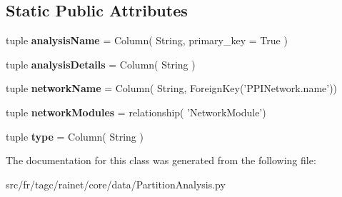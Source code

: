 \subsection*{Static Public Attributes}
\begin{DoxyCompactItemize}
\item 
\hypertarget{classsrc_1_1fr_1_1tagc_1_1rainet_1_1core_1_1data_1_1PartitionAnalysis_1_1PartitionAnalysis_a8151a5d4080cf71ca7425bfd0a0b0d81}{tuple {\bfseries analysis\-Name} = Column( String, primary\-\_\-key = True )}\label{classsrc_1_1fr_1_1tagc_1_1rainet_1_1core_1_1data_1_1PartitionAnalysis_1_1PartitionAnalysis_a8151a5d4080cf71ca7425bfd0a0b0d81}

\item 
\hypertarget{classsrc_1_1fr_1_1tagc_1_1rainet_1_1core_1_1data_1_1PartitionAnalysis_1_1PartitionAnalysis_aff8d031a12b0652881869d9e77bbc648}{tuple {\bfseries analysis\-Details} = Column( String )}\label{classsrc_1_1fr_1_1tagc_1_1rainet_1_1core_1_1data_1_1PartitionAnalysis_1_1PartitionAnalysis_aff8d031a12b0652881869d9e77bbc648}

\item 
\hypertarget{classsrc_1_1fr_1_1tagc_1_1rainet_1_1core_1_1data_1_1PartitionAnalysis_1_1PartitionAnalysis_aa0ad9c28fd195f301aa9e1d993ec00f5}{tuple {\bfseries network\-Name} = Column( String, Foreign\-Key('P\-P\-I\-Network.\-name'))}\label{classsrc_1_1fr_1_1tagc_1_1rainet_1_1core_1_1data_1_1PartitionAnalysis_1_1PartitionAnalysis_aa0ad9c28fd195f301aa9e1d993ec00f5}

\item 
\hypertarget{classsrc_1_1fr_1_1tagc_1_1rainet_1_1core_1_1data_1_1PartitionAnalysis_1_1PartitionAnalysis_a21b0d8705c328e9a1b9dea9a701c2a1e}{tuple {\bfseries network\-Modules} = relationship( 'Network\-Module')}\label{classsrc_1_1fr_1_1tagc_1_1rainet_1_1core_1_1data_1_1PartitionAnalysis_1_1PartitionAnalysis_a21b0d8705c328e9a1b9dea9a701c2a1e}

\item 
\hypertarget{classsrc_1_1fr_1_1tagc_1_1rainet_1_1core_1_1data_1_1PartitionAnalysis_1_1PartitionAnalysis_ad5d1461a6fb856a5d989d0d865b07cdf}{tuple {\bfseries type} = Column( String )}\label{classsrc_1_1fr_1_1tagc_1_1rainet_1_1core_1_1data_1_1PartitionAnalysis_1_1PartitionAnalysis_ad5d1461a6fb856a5d989d0d865b07cdf}

\end{DoxyCompactItemize}


The documentation for this class was generated from the following file\-:\begin{DoxyCompactItemize}
\item 
src/fr/tagc/rainet/core/data/Partition\-Analysis.\-py\end{DoxyCompactItemize}
